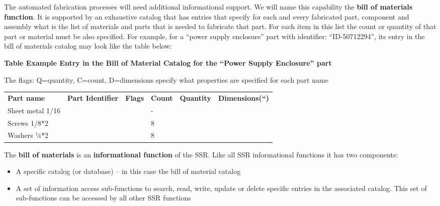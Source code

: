 \hypertarget{RefHeading3062306210128}{}The automated fabrication
processes will need additional informational support. We will name this
capability the \textbf{bill of materials function}. It is supported by
an exhaustive catalog that has entries that specify for each and every
fabricated part, component and assembly what is the list of materials
and parts that is needed to fabricate that part. For each item in this
list the count or quantity of that part or material must be also
specified. For example, for a “power supply enclosure” part with
identifier:  “ID-50712294”, its entry in the bill of materials catalog
may look like the table below:


{\bfseries
Table  Example Entry in the Bill of Material Catalog for the
``Power Supply Enclosure'' part}

The flags: Q=quantity, C=count, D=dimensions specify what properties are
specified for each part name


\bigskip

\begin{flushleft}
\tablehead{}
\begin{supertabular}{|m{1.3094599in}m{1.3573599in}m{0.9837598in}m{0.6705598in}m{0.82335985in}m{1.0323598in}|}
\hline
\textbf{Part name} &
\textbf{Part Identifier} &
\textbf{Flags} &
\textbf{Count} &
\textbf{Quantity} &
\textbf{Dimensions(“)}\\
Sheet metal  1/16 &
~
 &
~
 &
{}- &
~
 &
~
\\
Screws 1/8*2 &
~
 &
~
 &
8 &
~
 &
~
\\
Washers  ¼*2 &
~
 &
~
 &
8 &
~
 &
~
\\\hline
\end{supertabular}
\end{flushleft}

\bigskip

The \textbf{bill of materials} is an \textbf{informational function} of
the SSR. Like all SSR informational functions it has two components:


\bigskip

\begin{itemize}
\item A specific catalog (or database) – in this case the bill of
material catalog
\item A set of information access sub-functions to search, read, write,
update or delete specific entries in the associated catalog. This set
of sub-functions can be accessed by all other SSR functions 
\end{itemize}
